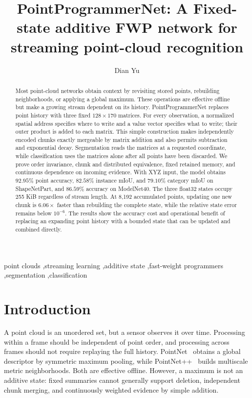 \documentclass[times,twocolumn,final,authoryear]{elsarticle}
\begin{document}
\begin{frontmatter}
\title{PointProgrammerNet: A Fixed-state additive FWP network for streaming point-cloud recognition}

\author[a]{Dian Yu}
\address[a]{University of New South Wales, Sydney, NSW 2052, Australia}

\begin{abstract}
Most point-cloud networks obtain context by revisiting stored points, rebuilding neighborhoods, or applying a global maximum. These operations are effective offline but make a growing stream dependent on its history. PointProgrammerNet replaces point history with three fixed $128\times170$ matrices. For every observation, a normalized spatial address specifies where to write and a value vector specifies what to write; their outer product is added to each matrix. This simple construction makes independently encoded chunks exactly mergeable by matrix addition and also permits subtraction and exponential decay. Segmentation reads the matrices at a requested coordinate, while classification uses the matrices alone after all points have been discarded. We prove order invariance, chunk and distributed equivalence, fixed retained memory, and continuous dependence on incoming evidence. With XYZ input, the model obtains $92.95\%$ point accuracy, $82.58\%$ instance mIoU, and $79.10\%$ category mIoU on ShapeNetPart, and $86.59\%$ accuracy on ModelNet40. The three float32 states occupy 255 KiB regardless of stream length. At 8,192 accumulated points, updating one new chunk is $6.06\times$ faster than rebuilding the complete state, while the relative state error remains below $10^{-6}$. The results show the accuracy cost and operational benefit of replacing an expanding point history with a bounded state that can be updated and combined directly.
\end{abstract}

\begin{keyword}
point clouds \sep streaming learning \sep additive state \sep fast-weight programmers \sep segmentation \sep classification
\end{keyword}
\end{frontmatter}

\section{Introduction}
A point cloud is an unordered set, but a sensor observes it over time. Processing within a frame should be independent of point order, and processing across frames should not require replaying the full history. PointNet~\cite{qi2017pointnet} obtains a global descriptor by symmetric maximum pooling, while PointNet++~\cite{qi2017pointnetplusplus} builds multiscale metric neighborhoods. Both are effective offline. However, a maximum is not an additive state: fixed summaries cannot generally support deletion, independent chunk merging, and continuously weighted evidence by simple addition.
\end{document}

